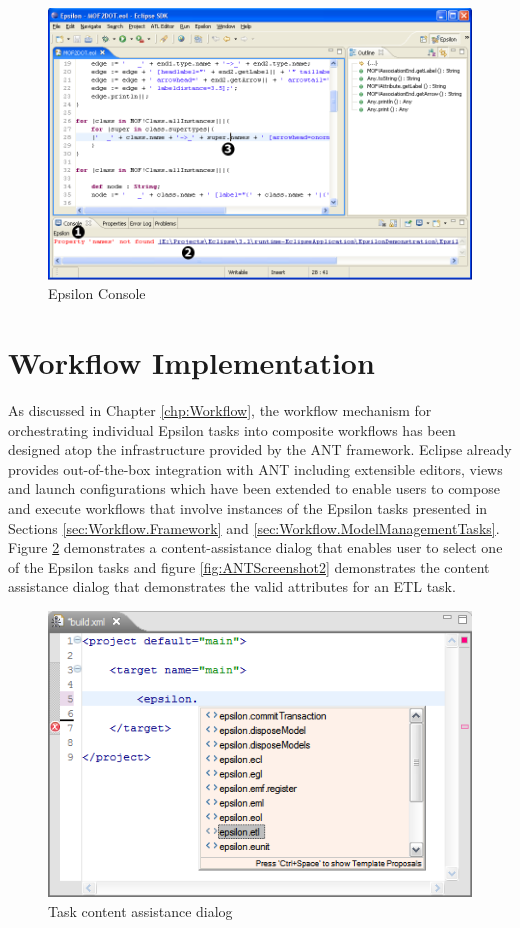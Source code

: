 \begin{figure}
	\centering
		\includegraphics[width=1.0\textwidth]{images/Console.png}
	\caption{Epsilon Console}
	\label{fig:Console}
\end{figure}

\section{Workflow Implementation}
\label{sec:Implementation.Workflow}

As discussed in Chapter \ref{chp:Workflow}, the workflow mechanism for orchestrating individual Epsilon tasks into composite workflows has been designed atop the infrastructure provided by the ANT framework. Eclipse already provides out-of-the-box integration with ANT including extensible editors, views and launch configurations which have been extended to enable users to compose and execute workflows that involve instances of the Epsilon tasks presented in Sections \ref{sec:Workflow.Framework} and \ref{sec:Workflow.ModelManagementTasks}. Figure \ref{fig:ANTScreenshot1} demonstrates a content-assistance dialog that enables user to select one of the Epsilon tasks and figure \ref{fig:ANTScreenshot2} demonstrates the content assistance dialog that demonstrates the valid attributes for an ETL task.

\begin{figure}
	\centering
		\includegraphics{images/ANTScreenshot1.png}
	\caption{Task content assistance dialog}
	\label{fig:ANTScreenshot1}
\end{figure}

